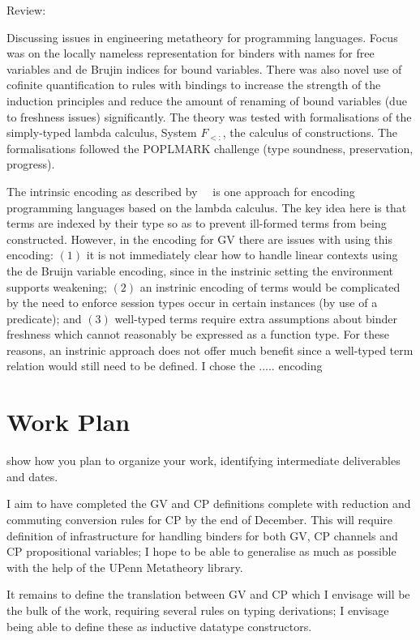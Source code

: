 \documentclass{mprop}
\begin{document}
Review:

Discussing issues in engineering metatheory for programming languages.
Focus was on the locally nameless representation for binders with names
for free variables and de Brujin indices for bound variables. There was
also novel use of cofinite quantification to rules with bindings to increase
the strength of the induction principles and reduce the amount of renaming
of bound variables (due to freshness issues) significantly. The theory was
tested with formalisations of the simply-typed lambda calculus,
System $F_{<:}$,
the calculus of constructions. The formalisations followed the POPLMARK
challenge (type soundness, preservation, progress).


The intrinsic encoding as described by~\citeauthor{Benton:2012:STT}~\cite{Benton:2012:STT} is one approach for encoding programming languages based on the lambda calculus. The key idea here is that terms are indexed by their type so as to prevent ill-formed terms from being constructed. However, in the encoding for GV there are issues with using this encoding: $(1)$ it is not immediately clear how to handle linear contexts using the de Bruijn variable encoding, since in the instrinic setting the environment supports weakening; $(2)$ an instrinic encoding of terms would be complicated by the need to enforce session types occur in certain instances (by use of a predicate); and $(3)$ well-typed terms require extra assumptions about binder freshness which cannot reasonably be expressed as a function type. For these reasons, an instrinic approach does not offer much benefit since a well-typed term relation would still need to be defined. I chose the ..... encoding


\section{Work Plan}

show how you plan to organize your work, identifying intermediate deliverables
and dates.

I aim to have completed the GV and CP definitions complete with reduction and commuting conversion rules for CP by the end of December. This will require definition of infrastructure for handling binders for both GV, CP channels and CP propositional variables; I hope to be able to generalise as much as possible with the help of the UPenn Metatheory library.

It remains to define the translation between GV and CP which I envisage will be the bulk of the work, requiring several rules on typing derivations; I envisage being able to define these as inductive datatype constructors.


\printbibliography
\end{document}
